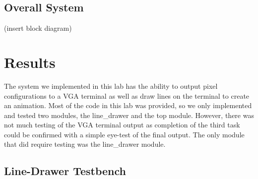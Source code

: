 \documentclass[11pt, titlepage]{article}
\begin{document}
        \subsection{Overall System}
            (insert block diagram)

    \newpage
    \section{Results}
        The system we implemented in this lab has the ability to output pixel configurations to a VGA terminal as well as draw lines on the terminal to create an animation. Most of the code in this lab was provided, so we only implemented and tested two modules, the line\_drawer and the top module. However, there was not much testing of the VGA terminal output as completion of the third task could be confirmed with a simple eye-test of the final output. The only module that did require testing was the line\_drawer module. 

        \subsection{Line-Drawer Testbench}
            
\end{document}
